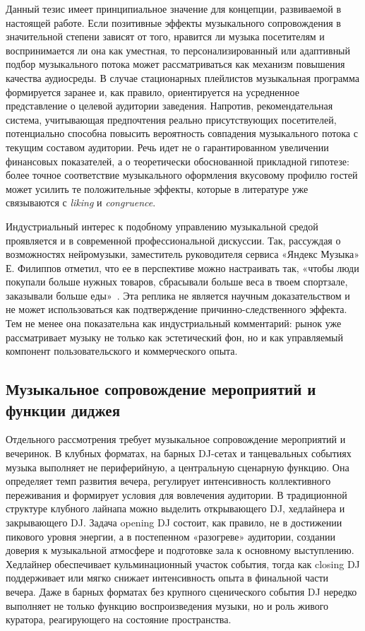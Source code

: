 Данный тезис имеет принципиальное значение для концепции, развиваемой в настоящей работе. Если позитивные эффекты музыкального сопровождения в значительной степени зависят от того, нравится ли музыка посетителям и воспринимается ли она как уместная, то персонализированный или адаптивный подбор музыкального потока может рассматриваться как механизм повышения качества аудиосреды. В случае стационарных плейлистов музыкальная программа формируется заранее и, как правило, ориентируется на усредненное представление о целевой аудитории заведения. Напротив, рекомендательная система, учитывающая предпочтения реально присутствующих посетителей, потенциально способна повысить вероятность совпадения музыкального потока с текущим составом аудитории. Речь идет не о гарантированном увеличении финансовых показателей, а о теоретически обоснованной прикладной гипотезе: более точное соответствие музыкального оформления вкусовому профилю гостей может усилить те положительные эффекты, которые в литературе уже связываются с \textit{liking} и \textit{congruence}.

Индустриальный интерес к подобному управлению музыкальной средой проявляется и в современной профессиональной дискуссии. Так, рассуждая о возможностях нейромузыки, заместитель руководителя сервиса «Яндекс Музыка» Е. Филиппов отметил, что ее в перспективе можно настраивать так, «чтобы люди покупали больше нужных товаров, сбрасывали больше веса в твоем спортзале, заказывали больше еды»~\cite{yandex_neuromusic_2022}. Эта реплика не является научным доказательством и не может использоваться как подтверждение причинно-следственного эффекта. Тем не менее она показательна как индустриальный комментарий: рынок уже рассматривает музыку не только как эстетический фон, но и как управляемый компонент пользовательского и коммерческого опыта.

\subsection{Музыкальное сопровождение мероприятий и функции диджея}

Отдельного рассмотрения требует музыкальное сопровождение мероприятий и вечеринок. В клубных форматах, на барных DJ-сетах и танцевальных событиях музыка выполняет не периферийную, а центральную сценарную функцию. Она определяет темп развития вечера, регулирует интенсивность коллективного переживания и формирует условия для вовлечения аудитории. В традиционной структуре клубного лайнапа можно выделить открывающего DJ, хедлайнера и закрывающего DJ. Задача opening DJ состоит, как правило, не в достижении пикового уровня энергии, а в постепенном «разогреве» аудитории, создании доверия к музыкальной атмосфере и подготовке зала к основному выступлению. Хедлайнер обеспечивает кульминационный участок события, тогда как closing DJ поддерживает или мягко снижает интенсивность опыта в финальной части вечера. Даже в барных форматах без крупного сценического события DJ нередко выполняет не только функцию воспроизведения музыки, но и роль живого куратора, реагирующего на состояние пространства.

